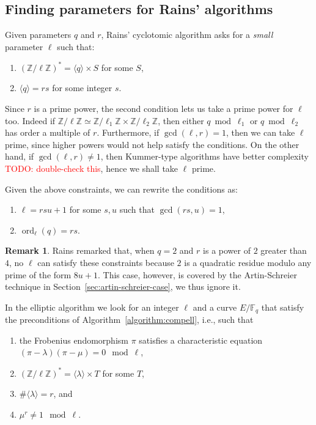\documentclass[12pt]{article}
\theoremstyle{plain}
\theoremstyle{definition}
\newtheorem*{remark}{Remark}
\newcommand{\todo}[1]{\textcolor{red}{TODO: #1}}
\DeclareMathOperator{\order}{ord} %
\def\Z{\ensuremath{\mathbb{Z}}}
\def\F{\ensuremath{\mathbb{F}}}
\newcounter{algorithm}
\begin{document}
\subsection{Finding parameters for Rains' algorithms}

Given parameters $q$ and $r$, Rains' cyclotomic algorithm asks for a
\emph{small} parameter $\ell$ such that:
\begin{enumerate}
\item $(\Z/\ell\Z)^\ast = \langle q\rangle \times S$ for some $S$,
\item $\langle q \rangle = rs$ for some integer $s$.
\end{enumerate}

Since $r$ is a prime power, the second condition lets us take a prime
power for $\ell$ too. Indeed if
$\Z/\ell\Z\simeq\Z/\ell_1\Z\times\Z/\ell_2\Z$, then either
$q\bmod\ell_1$ or $q\bmod\ell_2$ has order a multiple of $r$.
Furthermore, if $\gcd(\ell,r)=1$, then we can take $\ell$ prime, since
higher powers would not help satisfy the conditions. On the other
hand, if $\gcd(\ell,r)\ne1$, then Kummer-type algorithms have better
complexity \todo{double-check this}, hence we shall take $\ell$ prime.

Given the above constraints, we can rewrite the conditions as:
\begin{enumerate}
\item $\ell = rsu + 1$ for some $s,u$ such that $\gcd(rs,u)=1$,
\item $\order_\ell(q) = rs$.
\end{enumerate}

\begin{remark}
  Rains remarked that, when $q=2$ and $r$ is a power of $2$ greater
  than $4$, no $\ell$ can satisfy these constraints because $2$ is a
  quadratic residue modulo any prime of the form $8u+1$. This case,
  however, is covered by the Artin-Schreier technique in
  Section~\ref{sec:artin-schreier-case}, we thus ignore it.
\end{remark}

In the elliptic algorithm we look for an integer $\ell$ and a curve
$E/\F_q$ that satisfy the preconditions of
Algorithm~\ref{algorithm:compell}, i.e., such that 
\begin{enumerate}
\item the Frobenius endomorphism $\pi$ satisfies a characteristic
  equation $(\pi-\lambda)(\pi-\mu) = 0 \mod \ell$,
\item $(\Z/\ell\Z)^\ast = \langle\lambda\rangle\times T$ for some $T$,
\item $\#\langle\lambda\rangle=r$, and
\item $\mu^r\ne1\mod\ell$.
\end{enumerate}
\end{document}
